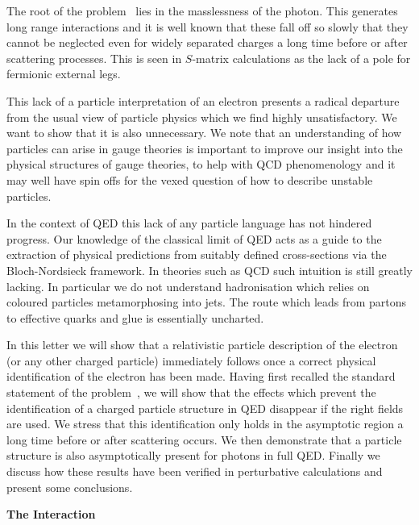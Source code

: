 \documentclass[12pt,a4paper]{article}
\newcommand{\no}{\noindent}
\begin{document}
The root of the problem~\cite{Dollard:1964} lies in the
masslessness of the photon. This generates long range interactions
and it is well known that these fall off so slowly that they
cannot be neglected even for widely separated charges a long time
before or after scattering processes. This is seen in $S$-matrix
calculations as the lack of a pole for fermionic external legs.

This lack of a particle interpretation of an electron presents a
radical departure from the usual view of particle physics which we
find highly unsatisfactory. We want to show that it is also unnecessary.
We note that an understanding of how particles can arise in gauge theories
is important to improve our insight into the physical structures of
gauge theories, to help with QCD phenomenology and it may well have spin
offs for the vexed question of how to describe unstable particles.


In the context of QED this lack of any particle language has not
hindered progress. Our knowledge of the classical limit of QED
acts as a guide to the extraction of physical predictions from
suitably defined cross-sections via the Bloch-Nordsieck framework.
In theories such as QCD such  intuition is still greatly lacking.
In particular we do not understand hadronisation which relies on
coloured particles metamorphosing into jets. The route which leads
from partons to effective quarks and glue is essentially uncharted.



In this letter we will show that a relativistic particle description  of the
electron (or any other charged particle) immediately follows once a
correct physical identification of the electron has been made. Having
first recalled the standard statement of the
problem~\cite{kulish:1970}, we will show that the effects which
prevent the identification of a charged particle structure in QED
disappear if the right fields are used. We stress that this
identification only holds in the asymptotic region a long time before
or after scattering occurs. We then demonstrate that a
particle structure is also asymptotically
present for photons in full QED. Finally we discuss how these results
have been verified in perturbative calculations and present some
conclusions.

\bigskip

\noindent \no \textbf{The Interaction}

\smallskip
\end{document}
